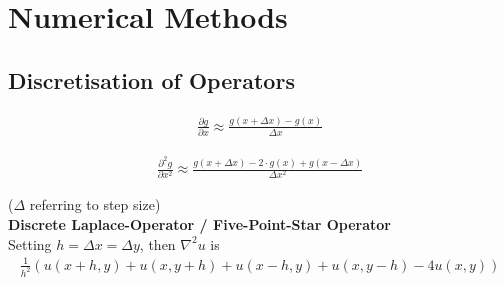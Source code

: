 \section{Numerical Methods}
\subsection{Discretisation of Operators}

\begin{align*}
	\frac{\partial g}{\partial x}
	\approx
	\frac{g(x + \Delta x) - g(x)}{\Delta x}
\end{align*}

\begin{align*}
	\frac{\partial^2 g}{\partial x^2}
	\approx
	\frac{g(x + \Delta x) - 2\cdot g(x) + g(x - \Delta x)}{\Delta x^2}
\end{align*}

($\Delta$ referring to step size)
\\[1em]
\textbf{Discrete Laplace-Operator / Five-Point-Star Operator}
\\
Setting $h = \Delta x = \Delta y$, then $\nabla^2u$ is
\begin{align*}
	\frac{1}{h^{2}}\left(u(x+h,y)+u(x,y+h)+u(x-h,y)+u(x,y-h)-4u(x,y)\right)
\end{align*}